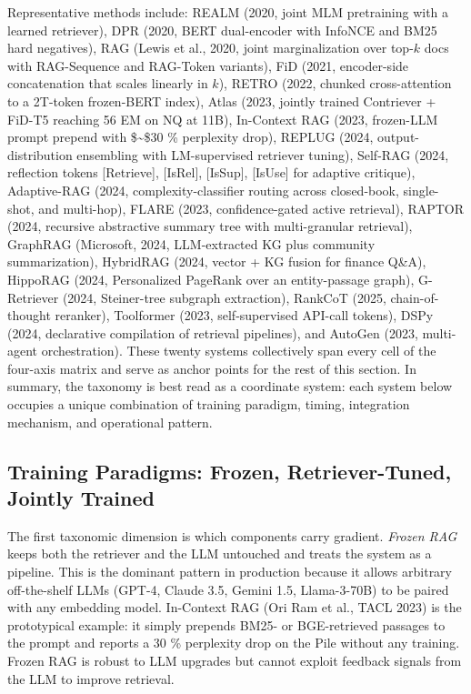 Representative methods include: REALM (2020, joint MLM pretraining with a learned retriever), DPR (2020, BERT dual-encoder with InfoNCE and BM25 hard negatives), RAG (Lewis et al., 2020, joint marginalization over top-\(k\) docs with RAG-Sequence and RAG-Token variants), FiD (2021, encoder-side concatenation that scales linearly in \(k\)), RETRO (2022, chunked cross-attention to a 2T-token frozen-BERT index), Atlas (2023, jointly trained Contriever + FiD-T5 reaching 56 EM on NQ at 11B), In-Context RAG (2023, frozen-LLM prompt prepend with \$\sim\$30 \% perplexity drop), REPLUG (2024, output-distribution ensembling with LM-supervised retriever tuning), Self-RAG (2024, reflection tokens {[}Retrieve{]}, {[}IsRel{]}, {[}IsSup{]}, {[}IsUse{]} for adaptive critique), Adaptive-RAG (2024, complexity-classifier routing across closed-book, single-shot, and multi-hop), FLARE (2023, confidence-gated active retrieval), RAPTOR (2024, recursive abstractive summary tree with multi-granular retrieval), GraphRAG (Microsoft, 2024, LLM-extracted KG plus community summarization), HybridRAG (2024, vector + KG fusion for finance Q\&A), HippoRAG (2024, Personalized PageRank over an entity-passage graph), G-Retriever (2024, Steiner-tree subgraph extraction), RankCoT (2025, chain-of-thought reranker), Toolformer (2023, self-supervised API-call tokens), DSPy (2024, declarative compilation of retrieval pipelines), and AutoGen (2023, multi-agent orchestration). These twenty systems collectively span every cell of the four-axis matrix and serve as anchor points for the rest of this section. In summary, the taxonomy is best read as a coordinate system: each system below occupies a unique combination of training paradigm, timing, integration mechanism, and operational pattern.

\subsection{Training Paradigms: Frozen, Retriever-Tuned, Jointly Trained}\label{training-paradigms-frozen-retriever-tuned-jointly-trained}

The first taxonomic dimension is which components carry gradient. \emph{Frozen RAG} keeps both the retriever and the LLM untouched and treats the system as a pipeline. This is the dominant pattern in production because it allows arbitrary off-the-shelf LLMs (GPT-4, Claude 3.5, Gemini 1.5, Llama-3-70B) to be paired with any embedding model. In-Context RAG (Ori Ram et al., TACL 2023) is the prototypical example: it simply prepends BM25- or BGE-retrieved passages to the prompt and reports a 30 \% perplexity drop on the Pile without any training. Frozen RAG is robust to LLM upgrades but cannot exploit feedback signals from the LLM to improve retrieval.

